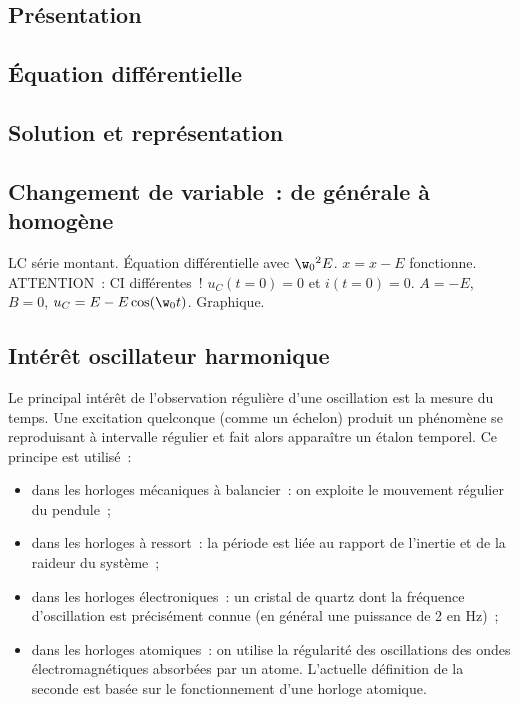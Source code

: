 \documentclass[../main/main.tex]{subfiles}
\begin{document}
\subsection{Présentation}

\subsection{Équation différentielle}

\subsection{Solution et représentation}

\subsection{Changement de variable~: de générale à homogène}

LC série montant. Équation différentielle avec $\w_0{}^2E$. $x = x-E$
fonctionne. ATTENTION~: CI différentes~! $u_C(t=0) = 0$ et $i(t=0) = 0$. $A =
-E$, $B=0$, $u_C = E - E\cos(\w_0t)$. Graphique.

\subsection{Intérêt oscillateur harmonique}

Le principal intérêt de l'observation régulière d'une oscillation est la mesure
du temps. Une excitation quelconque (comme un échelon) produit un phénomène se
reproduisant à intervalle régulier et fait alors apparaître un étalon
temporel. Ce principe est utilisé~:
\begin{itemize}
    \item dans les horloges mécaniques à balancier~: on exploite le mouvement
        régulier du pendule~;
    \item dans les horloges à ressort~: la période est liée au rapport de
        l'inertie et de la raideur du système~;
    \item dans les horloges électroniques~: un cristal de quartz dont la
        fréquence d'oscillation est précisément connue (en général une puissance
        de 2 en Hz)~;
    \item dans les horloges atomiques~: on utilise la régularité des
        oscillations des ondes électromagnétiques absorbées par un atome.
        L'actuelle définition de la seconde est basée sur le fonctionnement
        d'une horloge atomique.
\end{itemize}
\end{document}
